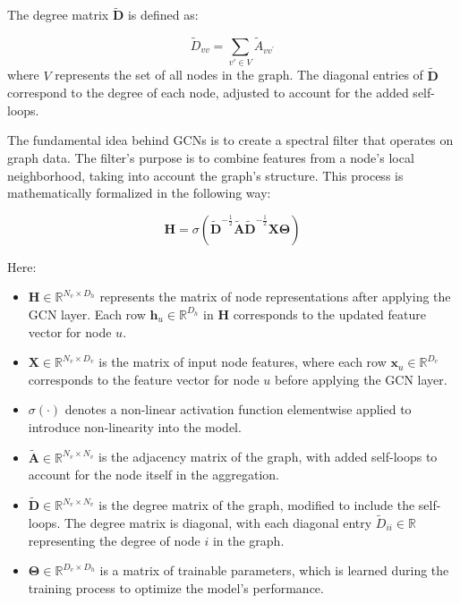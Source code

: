 The degree matrix \( \tilde{\mathbf{D}} \) is defined as:

\begin{equation}
    \tilde{D}_{vv} = \sum_{{v'} \in V} \tilde{A}_{vv^{'}}   
    \label{eq:degree_matrix}
\end{equation}
%
where \( V \) represents the set of all nodes in the graph. The diagonal entries of \( \tilde{\mathbf{D}} \) correspond to the degree of each node, adjusted to account for the added self-loops.




The fundamental idea behind GCNs is to create a spectral filter that operates on graph data. The filter's purpose is to combine features from a node's local neighborhood, taking into account the graph's structure. This process is mathematically formalized in the following way:

\begin{equation}
 \mathbf{H} = \sigma\left( \tilde{\mathbf{D}}^{-\frac{1}{2}} \tilde{\mathbf{A}} \tilde{\mathbf{D}}^{-\frac{1}{2}} \mathbf{X} \mathbf{\Theta} \right)   
    \label{eq:GCN_filter}
\end{equation}

\noindent Here:

\begin{itemize}
    \item \( \mathbf{H} \in \mathbb{R}^{N_v \times D_h} \) represents the matrix of node representations after applying the GCN layer. Each row \( \mathbf{h}_u \in \mathbb{R}^{D_h} \) in \( \mathbf{H} \) corresponds to the updated feature vector for node \( u \). 
    \item \( \mathbf{X} \in \mathbb{R}^{N_v \times D_v} \) is the matrix of input node features, where each row \( \mathbf{x}_u \in \mathbb{R}^{D_v} \) corresponds to the feature vector for node \( u \) before applying the GCN layer. 
    \item \( \sigma(\cdot) \) denotes a non-linear activation function elementwise applied to introduce non-linearity into the model. 
    \item \( \tilde{\mathbf{A}} \in \mathbb{R}^{N_v \times N_v} \) is the adjacency matrix of the graph, with added self-loops to account for the node itself in the aggregation. 
    \item \( \tilde{\mathbf{D}} \in \mathbb{R}^{N_v \times N_v} \) is the degree matrix of the graph, modified to include the self-loops. The degree matrix is diagonal, with each diagonal entry \( \tilde{D}_{ii} \in \mathbb{R} \) representing the degree of node \( i \) in the graph. 
    \item \( \mathbf{\Theta} \in \mathbb{R}^{D_v \times D_h} \) is a matrix of trainable parameters, which is learned during the training process to optimize the model's performance.
\end{itemize}


